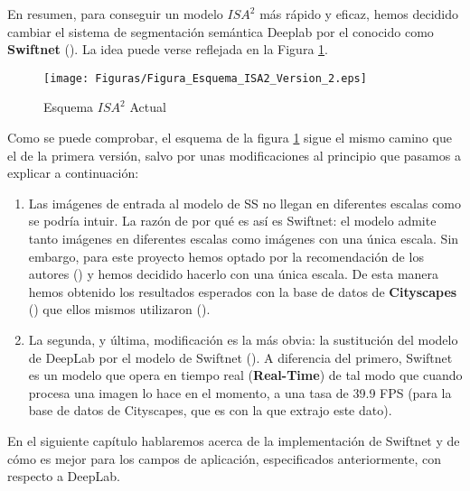 En resumen, para conseguir un modelo $ISA^{2}$ más rápido y eficaz, hemos decidido cambiar el sistema de segmentación semántica Deeplab por el conocido como \textbf{Swiftnet} (\cite{swiftnet}). La idea puede verse reflejada en la Figura \ref{fig:Isa_v2}.

\begin{figure}[H]
  \centering
  \texttt{[image: Figuras/Figura\_Esquema\_ISA2\_Version\_2.eps]}
  \caption{Esquema $ISA^{2}$ Actual}
    \label{fig:Isa_v2}
\end{figure}


Como se puede comprobar, el esquema de la figura \ref{fig:Isa_v2} sigue el mismo camino que el de la primera versión, salvo por unas modificaciones al principio que pasamos a explicar a continuación:

\begin{enumerate}

\item Las imágenes de entrada al modelo de \ac{SS} no llegan en diferentes escalas como se podría intuir. La razón de por qué es así es Swiftnet: el modelo admite tanto imágenes en diferentes escalas como imágenes con una única escala. Sin embargo, para este proyecto hemos optado por la recomendación de los autores (\cite{github_swiftnet}) y hemos decidido hacerlo con una única escala. De esta manera hemos obtenido los resultados esperados con la base de datos de \textbf{Cityscapes} (\cite{cityscapes}) que ellos mismos utilizaron (\cite{swiftnet}).

\item La segunda, y última, modificación es la más obvia: la sustitución del modelo de DeepLab por el modelo de Swiftnet (\cite{swiftnet}). A diferencia del primero, Swiftnet es un modelo que opera en tiempo real (\textbf{Real-Time}) de tal modo que cuando procesa una imagen lo hace en el momento, a una tasa de 39.9 \ac{FPS} (para la base de datos de Cityscapes, que es con la que extrajo este dato).%

\end{enumerate}


En el siguiente capítulo hablaremos acerca de la implementación de Swiftnet y de cómo es mejor para los campos de aplicación, especificados anteriormente, con respecto a DeepLab.
